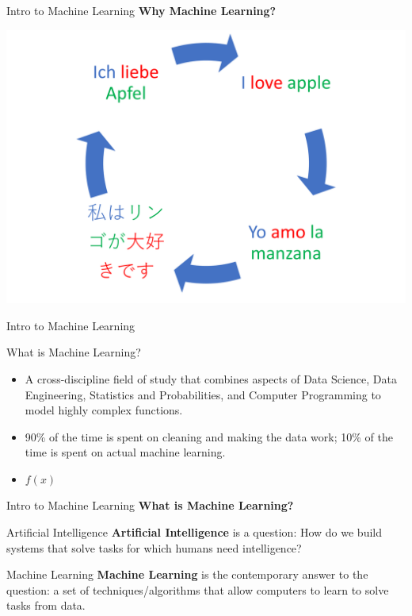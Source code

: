 \documentclass{beamer}
\begin{document}
\begin{frame}[fragile]{Intro to Machine Learning}
    \textbf{Why Machine Learning?}
    \begin{center}
        \includegraphics[width=\textwidth,height=0.8\textheight,keepaspectratio]{figures/Lang_2.png}
    \end{center}
\end{frame}

\begin{frame}[fragile]{Intro to Machine Learning}
    \begin{block}{What is Machine Learning?}
        \begin{itemize}
            \item A cross-discipline field of study that combines aspects of Data Science, Data Engineering, Statistics and Probabilities, and Computer Programming to model highly complex functions.
            \pause
            \item 90\% of the time is spent on cleaning and making the data work; 10\% of the time is spent on actual machine learning.
            \item \huge $f(x)$
        \end{itemize}
    \end{block}
\end{frame}
\begin{frame}[fragile]{Intro to Machine Learning}
    \textbf{What is Machine Learning?}
    \begin{block}{Artificial Intelligence}
        \textbf{Artificial Intelligence} is a question: How do we build systems that solve tasks for which humans need intelligence?
    \end{block}
    \begin{block}{Machine Learning}
        \textbf{Machine Learning} is the contemporary answer to the question: a set of techniques/algorithms that allow computers to learn to solve tasks from data.
    \end{block}
\end{frame}
\end{document}
